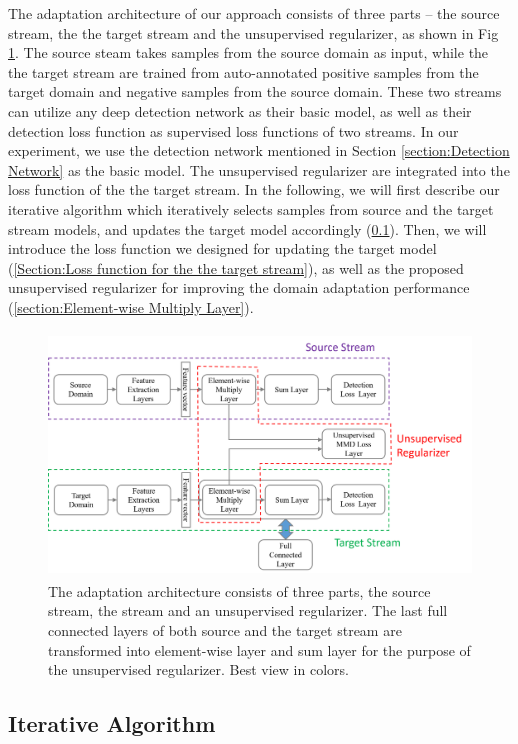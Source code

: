 \documentclass[runningheads]{llncs}
\begin{document}
The adaptation architecture of our approach consists of three parts -- the source stream, the the target stream and the unsupervised regularizer, as shown in Fig \ref{fig:streams}. The source steam takes samples from the source domain as input, while the the target stream are trained from auto-annotated positive samples from the target domain and negative samples from the source domain. These two streams can utilize any deep detection network as their basic model, as well as their detection loss function as supervised loss functions of two streams. In our experiment, we use the detection network mentioned in Section \ref{section:Detection Network} as the basic model. The unsupervised regularizer are integrated into the loss function of the the target stream.
In the following, we will first describe our iterative algorithm which iteratively selects samples from source and the target stream models, and updates the target model accordingly (\ref{Section:Iterative Algorithm}). Then, we will introduce the loss function we designed for updating the target model (\ref{Section:Loss function for the the target stream}), as well as the proposed unsupervised regularizer for improving the domain adaptation performance (\ref{section:Element-wise Multiply Layer}).


\begin{figure}
\centering
\includegraphics[height=6.5cm]{images/streams.png}
\caption{The adaptation architecture consists of three parts, the source stream, the stream and an unsupervised regularizer. The last full connected layers of both source and the target stream are transformed into element-wise layer and sum layer for the purpose of the unsupervised regularizer. Best view in colors.}
\label{fig:streams}
\end{figure}

\subsection{Iterative Algorithm}
\label{Section:Iterative Algorithm}
\end{document}
